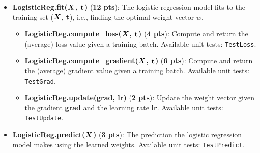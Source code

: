 \begin{itemize}
    \item {\bf LogisticReg.fit(${\bm{X}}$, ${\mathbf{t}}$)} ({\bf 12 pts}): The logistic regression model fits to the training set (${\bm{X}}$, ${\mathbf{t}}$), i.e., finding the optimal weight vector $w$.
    \begin{itemize}
        \item {\bf LogisticReg.compute\_loss(${\bm{X}}$, ${\mathbf{t}}$)} ({\bf 4 pts}): Compute and return the (average) loss value given a training batch. Available unit tests: \texttt{TestLoss}. 
        \item {\bf LogisticReg.compute\_gradient(${\bm{X}}$, ${\mathbf{t}}$)} ({\bf 6 pts}): Compute and return the (average) gradient value given a training batch. Available unit tests: \texttt{TestGrad}. 
        \item {\bf LogisticReg.update(grad, lr)} ({\bf 2 pts}): Update the weight vector given the gradient \textbf{grad} and the learning rate \textbf{lr}. Available unit tests: \texttt{TestUpdate}. 
    \end{itemize}
    
    \item {\bf LogisticReg.predict(${\bm{X}}$)} ({\bf 3 pts}): The prediction the logistic regression model makes using the learned weights. Available unit tests: \texttt{TestPredict}.
    
\end{itemize}



